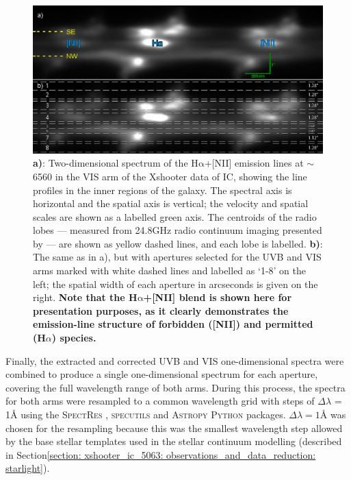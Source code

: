 \begin{figure}[!t]
	\includegraphics[width=\linewidth]{figures/xshooter_ic5063/apertures.png}
	\caption[Two-dimensional long-slit spectra along the radio axis of IC, with the positions of extracted apertures overlaid.]{\textbf{a)}: Two-dimensional spectrum of the H$\mathrm{\alpha}$+[NII] emission lines at $\sim$6560\;{\AA} in the VIS arm of the Xshooter data of IC, showing the line profiles in the inner regions of the galaxy. The spectral axis is horizontal and the spatial axis is vertical; the velocity and spatial scales are shown as a labelled green axis. The centroids of the radio lobes --- measured from 24.8\;GHz radio continuum imaging presented by \citet{Morganti2007} --- are shown as yellow dashed lines, and each lobe is labelled. \textbf{b)}: The same as in a), but with apertures selected for the UVB and VIS arms marked with white dashed lines and labelled as `1-8' on the left; the spatial width of each aperture in arcseconds is given on the right. \textbf{Note that the H$\mathrm{\alpha}$+[NII] blend is shown here for presentation purposes, as it clearly demonstrates the emission-line structure of forbidden ([NII]) and permitted (H$\alpha$) species.}}
	\label{fig: xshooter_ic5063: apertures}
\end{figure}

Finally, the extracted and corrected UVB and VIS one-dimensional spectra were combined to produce a single one-dimensional spectrum for each aperture, covering the full wavelength range of both arms. During this process, the spectra for both arms were resampled to a common wavelength grid with steps of $\Delta\lambda$ = 1{\;\AA} using the \textsc{SpectRes} \citep{Carnall2017}, \textsc{specutils} \citep{Earl2021} and \textsc{Astropy} \citep{AstropyCollaboration2013, AstropyCollaboration2018} \textsc{Python} packages. $\Delta\lambda = 1${\;\AA} was chosen for the resampling because this was the smallest wavelength step allowed by the base stellar templates used in the stellar continuum modelling (described in Section\;\ref{section: xshooter_ic_5063: observations_and_data_reduction: starlight}). 

